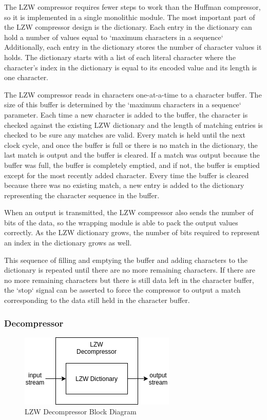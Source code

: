 \documentclass[doublespace,nopageskip]{VTthesis}
\begin{document}
The LZW compressor requires fewer steps to work than the Huffman compressor, so it is implemented in a single monolithic module. The most important part of the LZW compressor design is the dictionary. Each entry in the dictionary can hold a number of values equal to `maximum characters in a sequence` Additionally, each entry in the dictionary stores the number of character values it holds. The dictionary starts with a list of each literal character where the character's index in the dictionary is equal to its encoded value and its length is one character.

The LZW compressor reads in characters one-at-a-time to a character buffer. The size of this buffer is determined by the `maximum characters in a sequence` parameter. Each time a new character is added to the buffer, the character is checked against the existing LZW dictionary and the length of matching entries is checked to be sure any matches are valid. Every match is held until the next clock cycle, and once the buffer is full or there is no match in the dictionary, the last match is output and the buffer is cleared. If a match was output because the buffer was full, the buffer is completely emptied, and if not, the buffer is emptied except for the most recently added character. Every time the buffer is cleared because there was no existing match, a new entry is added to the dictionary representing the character sequence in the buffer.

When an output is transmitted, the LZW compressor also sends the number of bits of the data, so the wrapping module is able to pack the output values correctly. As the LZW dictionary grows, the number of bits required to represent an index in the dictionary grows as well.

This sequence of filling and emptying the buffer and adding characters to the dictionary is repeated until there are no more remaining characters. If there are no more remaining characters but there is still data left in the character buffer, the `stop` signal can be asserted to force the compressor to output a match corresponding to the data still held in the character buffer.

\subsubsection{Decompressor}\label{sss:lzw_decompressor_implementation}

\begin{figure}[htb]
	\centering
	\includegraphics[scale=1]{LZW Decompressor.png}
	\caption{LZW Decompressor Block Diagram}
	\label{fig:lzw_decompressor_block_diagram}
\end{figure}
\end{document}
